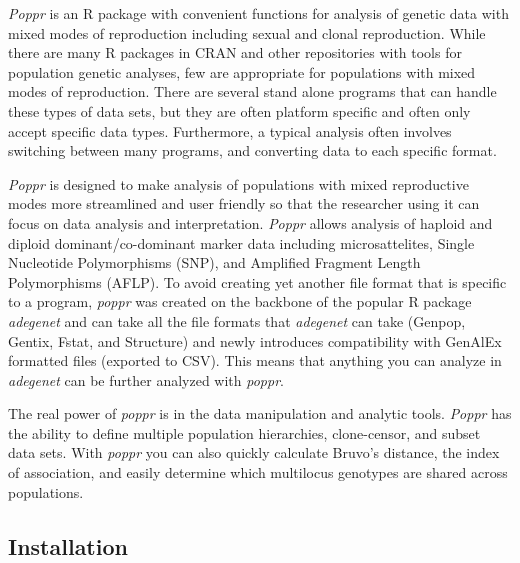 \documentclass[letterpaper]{article}
\newcommand{\tab}{\hspace*{1em}}
\begin{document}
\tab\tab\textit{Poppr} is an R package with convenient functions for analysis of genetic data with mixed modes of reproduction including sexual and clonal reproduction. While there are many R packages in CRAN and other repositories with tools for population genetic analyses, few are appropriate for populations with mixed modes of reproduction. There are several stand alone programs that can handle these types of data sets, but they are often platform specific and often only accept specific data types. Furthermore, a typical analysis often involves switching between many programs, and converting data to each specific format.

\textit{Poppr} is designed to make analysis of populations with mixed reproductive modes more streamlined and user friendly so that the researcher using it can focus on data analysis and interpretation. \textit{Poppr} allows analysis of haploid and diploid dominant/co-dominant marker data including microsattelites, Single Nucleotide Polymorphisms (SNP), and Amplified Fragment Length Polymorphisms (AFLP). To avoid creating yet another file format that is specific to a program, \textit{poppr} was created on the backbone of the popular R package \textit{adegenet} and can take all the file formats that \textit{adegenet} can take (Genpop, Gentix, Fstat, and Structure) and newly introduces compatibility with GenAlEx formatted files (exported to CSV). This means that anything you can analyze in \textit{adegenet} can be further analyzed with \textit{poppr}.

The real power of \textit{poppr} is in the data manipulation and analytic tools. \textit{Poppr} has the ability to define multiple population hierarchies, clone-censor, and subset data sets. With \textit{poppr} you can also quickly calculate Bruvo's distance, the index of association, and easily determine which multilocus genotypes are shared across populations.
\subsection{Installation}\label{intro:install}
\end{document}
